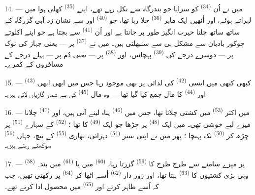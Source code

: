 \VUsaut{4.0mm}
\VUsaut{3.0mm}

14. --- میں نے اُن  \textsuperscript{(34)} کو
سراہا جو بندرگاہ سے نکل رہے تھے، اپنے 
\textsuperscript{(35)} کھلی ہوا میں لہراتے ہوئے، اور اُنھیں ایک ماہر
 \textsuperscript{(36)} چلا رہا تھا، جو
 \textsuperscript{(40)} اور
 سے نشان زد آبی گزرگاہ کے ساتھ ساتھ چلنا
حیرت انگیز طور پر جانتا ہے اور اُن 
\textsuperscript{(41)} سے بچتا ہے جو اپنے اکلوتے چوکور بادبان سے
مشکل ہی سے سنبھلتی ہیں۔ میں نے 
\textsuperscript{(37)} پر — یعنی جہاز کی نوک پر — دوسرے درجے کی
 \textsuperscript{(39)} پہچانیں، اور  \textsuperscript{(38)} پر — یعنی دُم پر — پہلے درجے کے مسافروں
کے کمرے۔

15. --- کبھی کبھی میں ایسی 
\textsuperscript{(42)} کی لدائی پر بھی موجود رہا جس میں ابھی ابھی
 \textsuperscript{(43)} اور 
\textsuperscript{(44)} کا مال جمع کیا گیا تھا — وہ مال  \textsuperscript{(45)} کی بے شمار گاڑیاں لاتی ہیں۔

\VUsaut{3.0mm}
\VUsaut{3.0mm}

16. --- میں اکثر  \textsuperscript{(53)} میں کشتی
چلاتا تھا، جس میں  \textsuperscript{(46)} پناہ لینے آتی
ہیں، اور  \textsuperscript{(47)} چلانا میرے لیے خوشی تھی۔
میں ایک  \textsuperscript{(48)} پر چڑھا جو ایک
 \textsuperscript{(49)} کا تھا ؛
 \textsuperscript{(52)} کے سہارے 
\textsuperscript{(51)} پر چڑھ کر 
\textsuperscript{(50)} تک پہنچا ؛ پھر میں نے اپنی سیر
 \textsuperscript{(54)} دہرائی، بھاری
 \textsuperscript{(55)} کے بیچ، جہاں
 \textsuperscript{(56)} سوکھتے رہتے ہیں۔

17. ---  \textsuperscript{(58)} پر میرے سامنے سے طرح طرح
کا  \textsuperscript{(59)} گزرتا رہا، 
\textsuperscript{(60)} میں یا  \textsuperscript{(61)}
میں بند۔ وہی بڑی کشتیوں کا  \textsuperscript{(63)} بنتا
تھا، اور زور دار  \textsuperscript{(62)} اُسے اٹھا کر
 \textsuperscript{(64)} پر رکھتی تھیں، جب کہ
 اُسے ظاہر کرتے اور 
\textsuperscript{(65)} میں محصول ادا کرتے تھے۔

